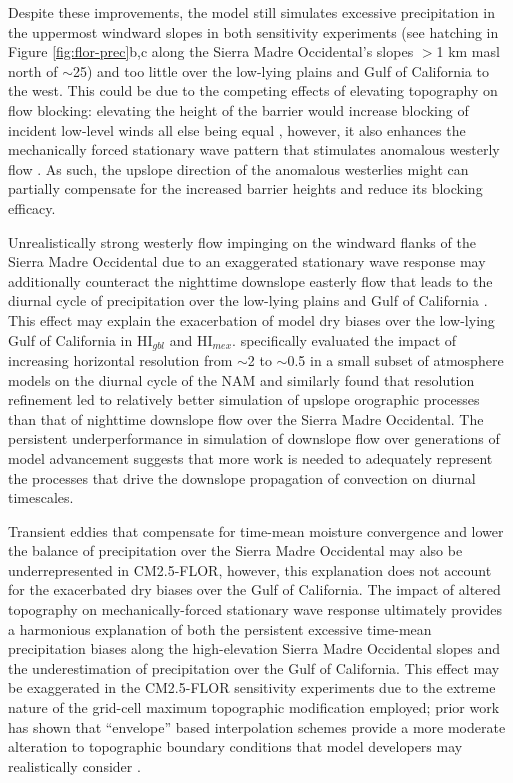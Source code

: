 \documentclass[draft]{agujournal2019}
\begin{document}
Despite these improvements, the model still simulates excessive precipitation in the uppermost windward slopes in both sensitivity experiments (see hatching in Figure \ref{fig:flor-prec}b,c along the Sierra Madre Occidental's slopes $>$1 km masl north of $\sim$25) and too little over the low-lying plains and Gulf of California to the west. This could be due to the competing effects of elevating topography on flow blocking: elevating the height of the barrier would increase blocking of incident low-level winds all else being equal \cite{galewsky08jas}, however, it also enhances the mechanically forced stationary wave pattern that stimulates anomalous westerly flow \cite{ringler99jas,boos21n}. As such, the upslope direction of the anomalous westerlies might can partially compensate for the increased barrier heights and reduce its blocking efficacy.%

Unrealistically strong westerly flow impinging on the windward flanks of the Sierra Madre Occidental due to an exaggerated stationary wave response may additionally counteract the nighttime downslope easterly flow that leads to the diurnal cycle of precipitation over the low-lying plains and Gulf of California \cite{berbery01jc,nesbitt08jh,castro12jc}. This effect may explain the exacerbation of model dry biases over the low-lying Gulf of California in HI$_{gbl}$ and HI$_{mex}$.  specifically evaluated the impact of increasing horizontal resolution from $\sim$2\textdegree{} to $\sim$0.5\textdegree{} in a small subset of atmosphere models on the diurnal cycle of the NAM and similarly found that resolution refinement led to relatively better simulation of upslope orographic processes than that of nighttime downslope flow over the Sierra Madre Occidental. The persistent underperformance in simulation of downslope flow over generations of model advancement suggests that more work is needed to adequately represent the processes that drive the downslope propagation of convection on diurnal timescales.

Transient eddies that compensate for time-mean moisture convergence and lower the balance of precipitation over the Sierra Madre Occidental \cite{boos21n} may also be underrepresented in CM2.5-FLOR, however, this explanation does not account for the exacerbated dry biases over the Gulf of California. The impact of altered topography on mechanically-forced stationary wave response ultimately provides a harmonious explanation of both the persistent excessive time-mean precipitation biases along the high-elevation Sierra Madre Occidental slopes and the underestimation of precipitation over the Gulf of California. This effect may be exaggerated in the CM2.5-FLOR sensitivity experiments due to the extreme nature of the grid-cell maximum topographic modification employed; prior work has shown that ``envelope'' based interpolation schemes provide a more moderate alteration to topographic boundary conditions that model developers may realistically consider \cite{meegan-kumar25jc}.
\end{document}
